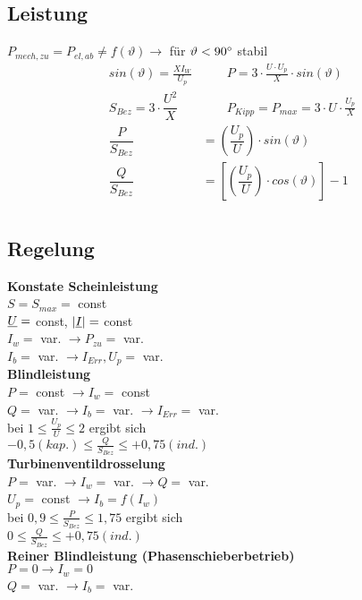 \subsection{Leistung}
$P_{mech,zu} = P_{el,ab} \neq f(\vartheta) \rightarrow$ für $\vartheta < 90\degree$ stabil\\
\begin{align*}
    sin(\vartheta) = \frac{XI_W}{U_p} & \qquad P = 3 \cdot \frac{U\cdot U_p}{X} \cdot sin(\vartheta)\\
    S_{Bez} = 3 \cdot \dfrac{U^2}{X} & \qquad P_{Kipp} = P_{max} = 3\cdot U \cdot \frac{U_p}{X}\\
    \dfrac{P}{S_{Bez}} &= \left(\dfrac{U_p}{U}\right) \cdot sin(\vartheta)\\
    \dfrac{Q}{S_{Bez}} &= \left[\left(\dfrac{U_p}{U}\right) \cdot cos(\vartheta)\right] -1\\
\end{align*}


\subsection{Regelung}

\textbf{Konstate Scheinleistung}\\
\indent $S = S_{max} =$ const\\
\indent $\underline{U}=$ const, $|\underline{I}| =$ const\\
\indent $I_w =$ var. $\rightarrow P_{zu}=$ var.\\
\indent $I_b =$ var. $\rightarrow I_{Err}, U_p =$ var.\\

\textbf{Blindleistung}\\
\indent $P =$ const $\rightarrow I_w= $ const\\
\indent $Q =$ var. $\rightarrow I_b = $ var. $\rightarrow I_{Err}=$ var.\\
\indent bei $1 \leq \frac{U_p}{U} \leq 2$ ergibt sich \\
\indent $-0,5 (kap.) \leq \frac{Q}{S_{Bez}} \leq +0,75(ind.)$\\

\textbf{Turbinenventildrosselung}\\
\indent $P =$ var. $\rightarrow I_w= $ var. $\rightarrow Q =$ var.\\
\indent $U_p =$ const $\rightarrow I_b = f(I_w)$\\
\indent bei $0,9 \leq \frac{P}{S_{Bez}} \leq 1,75$ ergibt sich\\
\indent $0 \leq \frac{Q}{S_{Bez}} \leq +0,75(ind.)$\\

\textbf{Reiner Blindleistung (Phasenschieberbetrieb)}\\
\indent $P = 0 \rightarrow I_w= 0$ \\
\indent $Q =$ var. $\rightarrow I_b = $ var.
